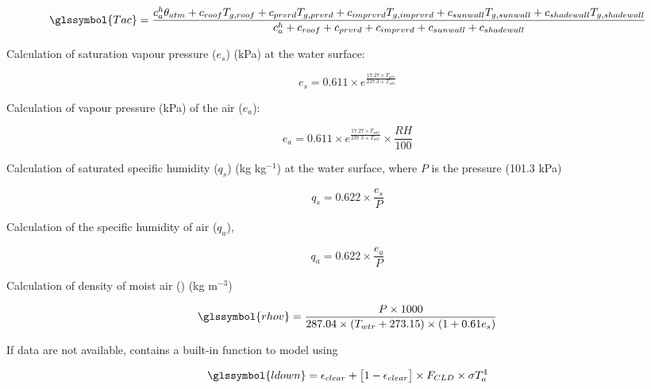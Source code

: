 \documentclass[final,3p,times,authoryear]{elsarticle}
\begin{document}
\begin{equation} 
\glssymbol{Tac} = \frac {c^{h}_{a}\theta_{atm} + c_{roof}T_{g,roof} + c_{prvrd}T_{g,prvrd} + c_{imprvrd}T_{g,imprvrd} + c_{sunwall}T_{g,sunwall} + c_{shadewall}T_{g,shadewall}}
                        {c^{h}_{a} + c_{roof} + c_{prvrd} + c_{imprvrd} + c_{sunwall} + c_{shadewall}}
\label{eq:clmu375} \end{equation}


Calculation of saturation vapour pressure ($e_{s}$) (kPa) at the water surface:

\begin{equation} 
e_{s} = 0.611 \times e^{ \frac{17.27 \times T_{wtr}}{237.3 + T_{wtr}} }
\label{eq:satva} \end{equation}


Calculation of vapour pressure (kPa) of the air ($e_{a}$):

\begin{equation} 
e_{a} =0.611 \times e^{ \frac{17.27 \times T_{wtr}}{237.3 + T_{wtr}} } \times \frac{RH}{100}
\label{eq:xx} \end{equation}

Calculation of saturated specific humidity ($q_{s}$) (kg kg$^{-1}$) at the water surface, where $P$ is the pressure (101.3 kPa) 
		
\begin{equation} 
q_{s} = 0.622 \times \frac{e_{s}}{P}
\label{eq:qs} \end{equation}		

Calculation of the specific humidity of air ($q_{a}$), 

\begin{equation} 
q_{a} = 0.622 \times \frac{e_{a}}{P}
\label{eq:qa} \end{equation}

Calculation of density of moist air () (kg m$^{-3}$)

\begin{equation} 
\glssymbol{rhov} = \frac{P \times 1000}{287.04 \times (T_{wtr} + 273.15) \times (1 + 0.61 e_{s})}
\label{eq:rhov} \end{equation}

If  data are not available,  contains a built-in function to model  using \citep{Loridan2010} 

\begin{equation} 
\glssymbol{ldown} = \epsilon_{clear} + \big[ 1 -\epsilon_{clear}  \big] \times F_{CLD} \times \sigma T^{4}_{a}
\label{eq:ldown} \end{equation}
\end{document}
